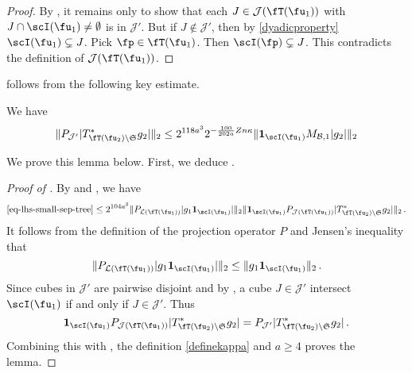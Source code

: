     \begin{proof}\leanok
        By , it remains only to show that each $J \in \mathcal{J}(\fT(\fu_1))$ with $J \cap \scI(\fu_1) \ne \emptyset$ is in $\mathcal{J}'$. But if $J \notin \mathcal{J}'$, then by \eqref{dyadicproperty} $\scI(\fu_1) \subsetneq J$. Pick $\fp \in \fT(\fu_1)$. Then $\scI(\fp) \subsetneq J$. This contradicts the definition of $\mathcal{J}(\fT(\fu_1))$.
    \end{proof}

     follows from the following key estimate.

    \begin{lemma}
        \label{bound-for-tree-projection}
        \leanok
        We have
        $$
            \|P_{\mathcal{J}'}|T_{\fT(\fu_2) \setminus \mathfrak{S}}^* g_2|\|_2
            \le 2^{118a^3} 2^{-\frac{100}{202a}Zn\kappa} \|\mathbf{1}_{\scI(\fu_1)} M_{\mathcal{B},1} |g_2|\|_2
        $$
    \end{lemma}

    We prove this lemma below. First, we deduce .

    \begin{proof}[Proof of ]
        By  and , we have
        \begin{align*}
            \eqref{eq-lhs-small-sep-tree} \le 2^{104a^3} \|P_{\mathcal{L}(\fT(\fu_1))} |g_1\mathbf{1}_{\scI(\fu_1)}| \|_2 \|\mathbf{1}_{\scI(\fu_1)} P_{\mathcal{J}(\fT(\fu_1) )}|T_{\fT(\fu_2) \setminus \mathfrak{S}}^* g_2|\|_2\,.
        \end{align*}
        It follows from the definition of the projection operator $P$ and Jensen's inequality that
        $$
            \|P_{\mathcal{L}(\fT(\fu_1))} |g_1\mathbf{1}_{\scI(\fu_1)}| \|_2 \le \|g_1 \mathbf{1}_{\scI(\fu_1)}\|_2\,.
        $$
        Since cubes in $\mathcal{J}'$ are pairwise disjoint and by , a cube $J \in \mathcal{J}'$ intersect $\scI(\fu_1)$ if and only if $J \in \mathcal{J}'$. Thus
        $$
            \mathbf{1}_{\scI(\fu_1)} P_{\mathcal{J}(\fT(\fu_1) )}|T_{\fT(\fu_2) \setminus \mathfrak{S}}^* g_2| = P_{\mathcal{J}'}|T_{\fT(\fu_2) \setminus \mathfrak{S}}^* g_2|\,.
        $$
        Combining this with , the definition \eqref{definekappa} and $a \ge 4$ proves the lemma.
    \end{proof}


